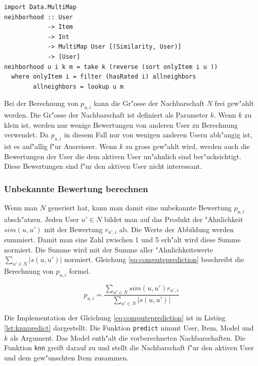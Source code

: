 \documentclass[a4paper, 12pt]{article}
\begin{document}
\begin{lstlisting}[caption=Funktion um die Nachbarschaft f"ur ein User und ein Item zu generieren, label=lst:neighborhood]
import Data.MultiMap
neihborhood :: User
            -> Item
            -> Int
            -> MultiMap User [(Similarity, User)]
            -> [User]
neihborhood u i k m = take k (reverse (sort onlyItem i u ))
  where onlyItem i = filter (hasRated i) allneighbors
        allneighbors = lookup u m
\end{lstlisting}

Bei der Berechnung von $p_{u,i}$ kann die Gr"osse der Nachbarschaft $N$ frei gew"ahlt werden. Die Gr"osse der Nachbarschaft ist definiert als Parameter $k$. Wenn $k$ zu klein ist, werden nur wenige Bewertungen von anderen User zu Berechnung verwendet. Da $p_{u,i}$ in diesem Fall nur von wenigen anderen Usern abh"angig ist, ist es anf"allig f"ur Ausreisser. Wenn $k$ zu gross gew"ahlt wird, werden auch die Bewertungen der User die dem aktiven User un"ahnlich sind ber"ucksichtigt. Diese Bewertungen sind f"ur den aktiven User nicht interessant. 

\subsubsection{Unbekannte Bewertung berechnen}
\label{sec:predict}

Wenn man $N$ generiert hat, kann man damit eine unbekannte Bewertung $p_{u,i}$ absch"atzen. Jeden User $u' \in N$ bildet man auf das Produkt der "Ahnlichkeit $sim(u,u')$ mit der Bewertung $r_{u',i}$ ab. Die Werte der Abbildung werden summiert. Damit man eine Zahl zwischen 1 und 5 erh"alt wird diese Summe normiert. Die Summe wird mit der Summe aller "Ahnlichkeitswerte $\sum_{u' \in N}{|s(u,u')|}$ normiert. Gleichung \ref{eq:computeprediction} beschreibt die Berechnung von $p_{u,i}$ formel.

\begin{equation}
  \label{eq:computeprediction}
  p_{u,i} = \frac{\sum_{u' \in N}{sim(u,u') r_{u',i}}}{\sum_{u' \in N}{|s(u,u')|}}
\end{equation}

Die Implementation der Gleichung \ref{eq:computeprediction} ist in Listing \ref{lst:knnpredict} dargestellt. Die Funktion \verb|predict| nimmt User, Item, Model und $k$ als Argument. Das Model enth"alt die vorberechneten Nachbarschaften. Die Funktion \verb|knn| greift darauf zu und stellt die Nachbarschaft f"ur den aktiven User und dem gew"unschten Item zusammen.
\end{document}

